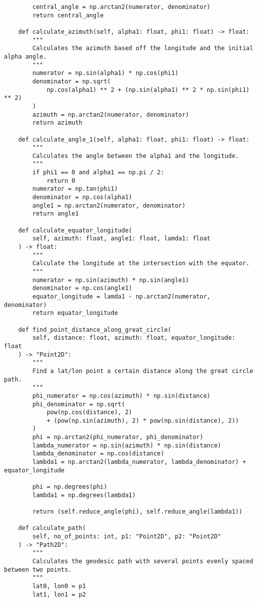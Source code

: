 \begin{verbatim}
        central_angle = np.arctan2(numerator, denominator)
        return central_angle

    def calculate_azimuth(self, alpha1: float, phi1: float) -> float:
        """
        Calculates the azimuth based off the longitude and the initial alpha angle.
        """
        numerator = np.sin(alpha1) * np.cos(phi1)
        denominator = np.sqrt(
            np.cos(alpha1) ** 2 + (np.sin(alpha1) ** 2 * np.sin(phi1) ** 2)
        )
        azimuth = np.arctan2(numerator, denominator)
        return azimuth

    def calculate_angle_1(self, alpha1: float, phi1: float) -> float:
        """
        Calculates the angle between the alpha1 and the longitude.
        """
        if phi1 == 0 and alpha1 == np.pi / 2:
            return 0
        numerator = np.tan(phi1)
        denominator = np.cos(alpha1)
        angle1 = np.arctan2(numerator, denominator)
        return angle1

    def calculate_equator_longitude(
        self, azimuth: float, angle1: float, lamda1: float
    ) -> float:
        """
        Calculate the longitude at the intersection with the equator.
        """
        numerator = np.sin(azimuth) * np.sin(angle1)
        denominator = np.cos(angle1)
        equator_longitude = lamda1 - np.arctan2(numerator, denominator)
        return equator_longitude

    def find_point_distance_along_great_circle(
        self, distance: float, azimuth: float, equator_longitude: float
    ) -> "Point2D":
        """
        Find a lat/lon point a certain distance along the great circle path.
        """
        phi_numerator = np.cos(azimuth) * np.sin(distance)
        phi_denominator = np.sqrt(
            pow(np.cos(distance), 2)
            + (pow(np.sin(azimuth), 2) * pow(np.sin(distance), 2))
        )
        phi = np.arctan2(phi_numerator, phi_denominator)
        lambda_numerator = np.sin(azimuth) * np.sin(distance)
        lambda_denominator = np.cos(distance)
        lambda1 = np.arctan2(lambda_numerator, lambda_denominator) + equator_longitude

        phi = np.degrees(phi)
        lambda1 = np.degrees(lambda1)

        return (self.reduce_angle(phi), self.reduce_angle(lambda1))

    def calculate_path(
        self, no_of_points: int, p1: "Point2D", p2: "Point2D"
    ) -> "Path2D":
        """
        Calculates the geodesic path with several points evenly spaced between two points.
        """
        lat0, lon0 = p1
        lat1, lon1 = p2


\end{verbatim}
